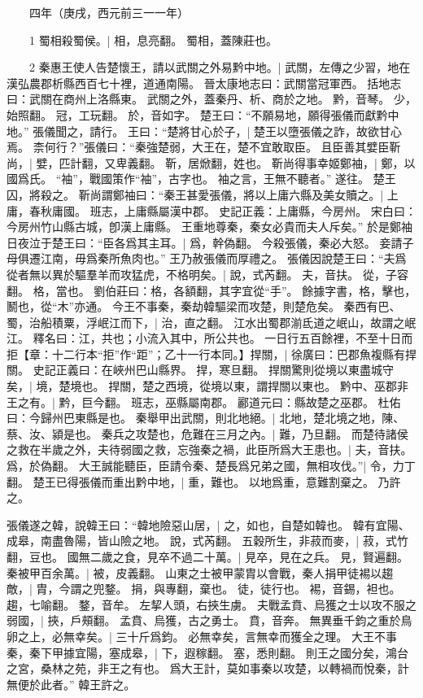 　　四年（庚戌，西元前三一一年）

　　1 蜀相殺蜀侯。|{
	相，息亮翻。
	蜀相，蓋陳莊也。
}

　　2 秦惠王使人告楚懷王，請以武關之外易黔中地。|{
	武關，左傳之少習，地在漢弘農郡析縣西百七十裡，道通南陽。
	晉太康地志曰：武關當冠軍西。
	括地志曰：武關在商州上洛縣東。
	武關之外，蓋秦丹、析、商於之地。
	黔，音琴。
	少，始照翻。
	冠，工玩翻。
	於，音如字。
}
楚王曰：“不願易地，願得張儀而獻黔中地。”
張儀聞之，請行。
王曰：“楚將甘心於子，|{
	楚王以墮張儀之詐，故欲甘心焉。
}
柰何行？”張儀曰：“秦強楚弱，大王在，楚不宜敢取臣。
	且臣善其嬖臣靳尚，|{
	嬖，匹計翻，又卑義翻。
	靳，居焮翻，姓也。
}
靳尚得事幸姬鄭袖，|{
	鄭，以國爲氏。
	“袖”，戰國策作“袖”，古字也。
}
袖之言，王無不聽者。”
遂往。
楚王囚，將殺之。
靳尚謂鄭袖曰：“秦王甚愛張儀，將以上庸六縣及美女贖之。|{
	上庸，春秋庸國。
	班志，上庸縣屬漢中郡。
	史記正義：上庸縣，今房州。
	宋白曰：今房州竹山縣古城，卽漢上庸縣。
}
王重地尊秦，秦女必貴而夫人斥矣。”
於是鄭袖日夜泣于楚王曰：“臣各爲其主耳。|{
	爲，幹偽翻。
}
今殺張儀，秦必大怒。
	妾請子母俱遷江南，毋爲秦所魚肉也。”
	王乃赦張儀而厚禮之。
	張儀因說楚王曰：“夫爲從者無以異於驅羣羊而攻猛虎，不格明矣。|{
	說，式芮翻。
	夫，音扶。
	從，子容翻。
	格，當也。
	劉伯莊曰：格，各額翻，其字宜從“手”。
	餘據字書，格，擊也，鬭也，從“木”亦通。
}
今王不事秦，秦劫韓驅梁而攻楚，則楚危矣。
秦西有巴、蜀，治船積粟，浮岷江而下，|{
	治，直之翻。
	江水出蜀郡湔氐道之岷山，故謂之岷江。
	釋名曰：江，共也；小流入其中，所公共也。
}
一日行五百餘裡，不至十日而拒【章：十二行本“拒”作“距”；乙十一行本同。】捍關，|{
	徐廣曰：巴郡魚複縣有捍關。
	史記正義曰：在峽州巴山縣界。
	捍，寒旦翻。
}
捍關驚則從境以東盡城守矣，|{
	境，楚境也。
	捍關，楚之西境，從境以東，謂捍關以東也。
}
黔中、巫郡非王之有。|{
	黔，巨今翻。
	班志，巫縣屬南郡。
	酈道元曰：縣故楚之巫郡。
	杜佑曰：今歸州巴東縣是也。
}
秦舉甲出武關，則北地絕。|{
	北地，楚北境之地，陳、蔡、汝、潁是也。
}
秦兵之攻楚也，危難在三月之內。|{
	難，乃旦翻。
}
而楚待諸侯之救在半歲之外，夫待弱國之救，忘強秦之禍，此臣所爲大王患也。|{
	夫，音扶。
	爲，於偽翻。
}
大王誠能聽臣，臣請令秦、楚長爲兄弟之國，無相攻伐。”|{
	令，力丁翻。
}
楚王已得張儀而重出黔中地，|{
	重，難也。
	以地爲重，意難割棄之。
}
乃許之。


張儀遂之韓，說韓王曰：“韓地險惡山居，|{
	之，如也，自楚如韓也。
	韓有宜陽、成皋，南盡魯陽，皆山險之地。
	說，式芮翻。
}
五穀所生，非菽而麥，|{
	菽，式竹翻，豆也。
}
國無二歲之食，見卒不過二十萬。|{
	見卒，見在之兵。
	見，賢遍翻。
}
秦被甲百余萬。|{
	被，皮義翻。
}
山東之士被甲蒙胄以會戰，秦人捐甲徒裼以趨敵，|{
	胄，今謂之兜鍪。
	捐，與專翻，棄也。
	徒，徒行也。
	裼，音錫，袒也。
	趨，七喻翻。
	鍪，音牟。
}
左挈人頭，右挾生虜。
	夫戰孟賁、烏獲之士以攻不服之弱國，|{
	挾，戶頰翻。
	孟賁、烏獲，古之勇士。
	賁，音奔。
}
無異垂千鈞之重於鳥卵之上，必無幸矣。|{
	三十斤爲鈞。
	必無幸矣，言無幸而獲全之理。
}
大王不事秦，秦下甲據宜陽，塞成皋，|{
	下，遐稼翻。
	塞，悉則翻。
}
則王之國分矣，鴻台之宮，桑林之苑，非王之有也。
爲大王計，莫如事秦以攻楚，以轉禍而悅秦，計無便於此者。”
韓王許之。


